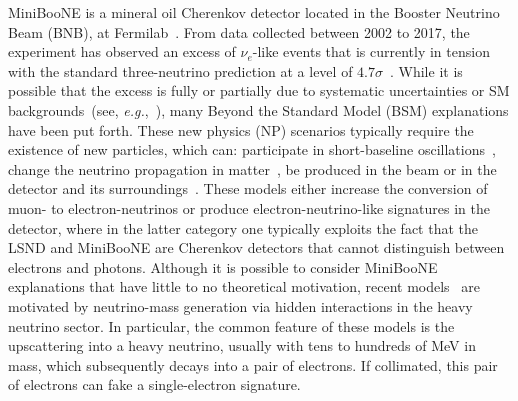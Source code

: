 MiniBooNE is a mineral oil Cherenkov detector located in the Booster Neutrino Beam (BNB), at Fermilab~\cite{AguilarArevalo:2008yp,AguilarArevalo:2008qa}. From data collected between 2002 to 2017, the experiment has observed an excess of $\nu_e$-like events that is currently in tension with the standard three-neutrino prediction at a level of $4.7 \sigma$~\cite{Aguilar-Arevalo:2018gpe}. While it is possible that the excess is fully or partially due to systematic uncertainties or SM backgrounds~(see, \textit{e.g.},~\cite{AguilarArevalo:2008rc,Aguilar-Arevalo:2012fmn,Hill:2010zy}), many Beyond the Standard Model (BSM) explanations have been put forth. These new physics (NP) scenarios typically require the existence of new particles, which can: participate in short-baseline oscillations~\cite{Murayama:2000hm,Strumia:2002fw,Barenboim:2002ah, GonzalezGarcia:2003jq,Barger:2003xm,Sorel:2003hf,Barenboim:2004wu, Zurek:2004vd, Kaplan:2004dq, Pas:2005rb,deGouvea:2006qd,Schwetz:2007cd, Farzan:2008zv,Hollenberg:2009ws,Nelson:2010hz,Akhmedov:2010vy, Diaz:2010ft,Bai:2015ztj, Giunti:2015mwa,Papoulias:2016edm, Moss:2017pur,Carena:2017qhd}, change the neutrino propagation in matter~\cite{Liao:2016reh, Liao:2018mbg,Asaadi:2017bhx,Doring:2018cob}, be produced in the beam or in the detector and its surroundings~\cite{Gninenko:2009ks,Gninenko:2010pr,Dib:2011jh,McKeen:2010rx,Masip:2012ke, Masip:2011qb,Gninenko:2012rw,Magill:2018jla}. These models either increase the conversion of muon- to electron-neutrinos or produce electron-neutrino-like signatures in the detector, where in the latter category one typically exploits the fact that the LSND and MiniBooNE are Cherenkov detectors that cannot distinguish between electrons and photons. Although it is possible to consider MiniBooNE explanations that have little to no theoretical motivation, recent models~\cite{Bertuzzo:2018itn,Bertuzzo:2018ftf,Ballett:2018ynz} are motivated by neutrino-mass generation via hidden interactions in the heavy neutrino sector. In particular, the common feature of these models is the upscattering into a heavy neutrino, usually with tens to hundreds of MeV in mass, which subsequently decays into a pair of electrons. If collimated, this pair of electrons can fake a single-electron signature. 

